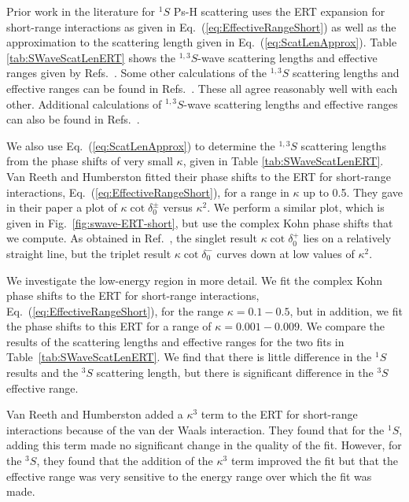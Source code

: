 \documentclass[preprint,showpacs,showkeys,preprintnumbers,amsmath,amssymb,longbibliography,pra,aps]{revtex4-1}
\begin{document}
{Prior work in the literature for $^1S$ Ps-H scattering
\cite{Blackwood2002,Ivanov2002,VanReeth2003}
uses the ERT expansion for short-range interactions as
given in Eq.~(\ref{eq:EffectiveRangeShort}) as well as the
approximation to the scattering length given in Eq.~(\ref{eq:ScatLenApprox}).
Table \ref{tab:SWaveScatLenERT} shows the $^{1,3}S$-wave
scattering lengths and effective ranges given by
Refs.~\cite{Blackwood2002,Ivanov2002,VanReeth2003,Walters2004}.
Some other calculations of the $^{1,3}S$ scattering lengths and
effective ranges can be found in
Refs.~\cite{Sinha2000,Ivanov2001,Chiesa2002,Ivanov2002}.
These all agree reasonably well with each other. Additional calculations
of $^{1,3}S$-wave scattering lengths and effective ranges can also be found in
Refs.~\cite{Hara1975,Page1976,Drachman1975,
Drachman1976,Campbell1998,Adhikari1999,Adhikari2001b}.

We also use Eq.~(\ref{eq:ScatLenApprox}) to determine the $^{1,3}S$
scattering lengths from the phase shifts of very small $\kappa$, given
in Table \ref{tab:SWaveScatLenERT}. Van Reeth and Humberston
\cite{VanReeth2003} fitted their phase shifts to the ERT for short-range
interactions, Eq.~(\ref{eq:EffectiveRangeShort}), for a range in $\kappa$
up to 0.5. They gave in their paper a plot of $\kappa \cot \delta_0^\pm$
versus $\kappa^2$. We perform a similar plot, which is given in
Fig.~\ref{fig:swave-ERT-short}, but use the complex Kohn phase shifts
that we compute. As obtained in Ref.~\cite{VanReeth2003}, the singlet
result $\kappa \cot \delta_0^+$ lies on a relatively straight line, but
the triplet result $\kappa \cot \delta_0^-$ curves down at low
values of $\kappa^2$.

We investigate the low-energy region in more detail. We fit the
complex Kohn phase shifts to the ERT for short-range interactions,
Eq.~(\ref{eq:EffectiveRangeShort}), for the range $\kappa = 0.1 - 0.5$, but
in addition, we fit the phase shifts to this ERT for a range of
$\kappa = 0.001 - 0.009$. We compare the results of the scattering lengths
and effective ranges for the two fits in Table~\ref{tab:SWaveScatLenERT}.
We find that there is little difference in the $^1S$ results and the $^3S$
scattering length, but there is significant difference in the $^3S$
effective range.

Van Reeth and Humberston \cite{VanReeth2003} added a $\kappa^3$ term to the
ERT for short-range interactions because of the van der Waals interaction.
They found that for the $^1S$, adding this term made no significant change in the
quality of the fit. However, for the $^3S$, they found that the addition of
the $\kappa^3$ term improved the fit but that the effective range was very sensitive
to the energy range over which the fit was made.

}
\end{document}
